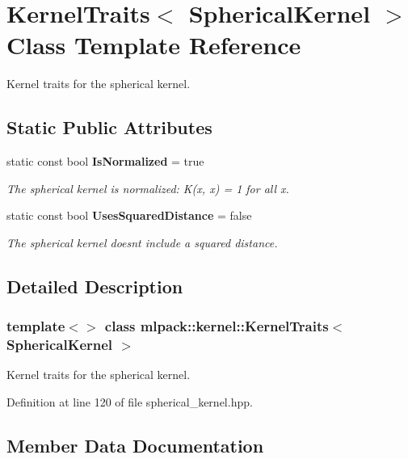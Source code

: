 \section{Kernel\+Traits$<$ Spherical\+Kernel $>$ Class Template Reference}
\label{classmlpack_1_1kernel_1_1KernelTraits_3_01SphericalKernel_01_4}


Kernel traits for the spherical kernel.  


\subsection*{Static Public Attributes}
\begin{DoxyCompactItemize}
\item 
static const bool \textbf{ Is\+Normalized} = true
\begin{DoxyCompactList}\small\item\em The spherical kernel is normalized\+: K(x, x) = 1 for all x. \end{DoxyCompactList}\item 
static const bool \textbf{ Uses\+Squared\+Distance} = false
\begin{DoxyCompactList}\small\item\em The spherical kernel doesn\textquotesingle{}t include a squared distance. \end{DoxyCompactList}\end{DoxyCompactItemize}


\subsection{Detailed Description}
\subsubsection*{template$<$$>$\newline
class mlpack\+::kernel\+::\+Kernel\+Traits$<$ Spherical\+Kernel $>$}

Kernel traits for the spherical kernel. 

Definition at line 120 of file spherical\+\_\+kernel.\+hpp.



\subsection{Member Data Documentation}
\mbox{\label{classmlpack_1_1kernel_1_1KernelTraits_3_01SphericalKernel_01_4_a213c74e1e7c01890b64c8b9e88f8c0dc}} 
